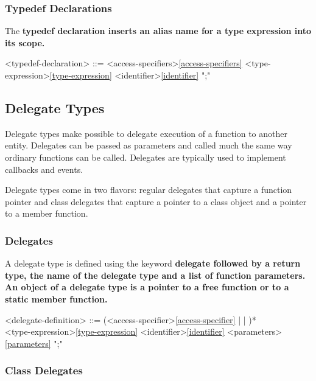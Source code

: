 \documentclass[a4paper,oneside,11pt]{article}
\begin{document}
\subsubsection{Typedef Declarations}

The \bf{typedef} declaration inserts an alias name for a type expression into its scope.

\begin{grammar}
\label{typedef-declaration}<typedef-declaration> ::= <access-specifiers>\ref{access-specifiers}  <type-expression>\ref{type-expression} <identifier>\ref{identifier} ";"
\end{grammar}

\subsection{Delegate Types}

Delegate types make possible to delegate execution of a function to another entity.
Delegates can be passed as parameters and called much the same way ordinary functions can be called.
Delegates are typically used to implement callbacks and events.

Delegate types come in two flavors: regular delegates that capture a function pointer and
class delegates that capture a pointer to a class object and a pointer to a member function.

\subsubsection{Delegates}

A delegate type is defined using the keyword \bf{delegate} followed by a return type, the name of the delegate type and a
list of function parameters.
An object of a delegate type is a pointer to a free function or to a static member function.

\begin{grammar}
\label{delegate-definition}<delegate-definition> ::= (<access-specifier>\ref{access-specifier} |  | )* \\
<type-expression>\ref{type-expression} <identifier>\ref{identifier} <parameters>\ref{parameters} ";"
\end{grammar}

\subsubsection{Class Delegates}
\end{document}
